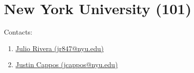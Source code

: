\section{New York University (101)}
\label{sec:NYU}

Contacts:\begin{enumerate}
 \item {}\href{mailto:jr847@nyu.edu}{Julio Rivera (jr847@nyu.edu)}
 \item {}\href{mailto:jcappos@nyu.edu}{Justin Cappos (jcappos@nyu.edu)}
\end{enumerate}


